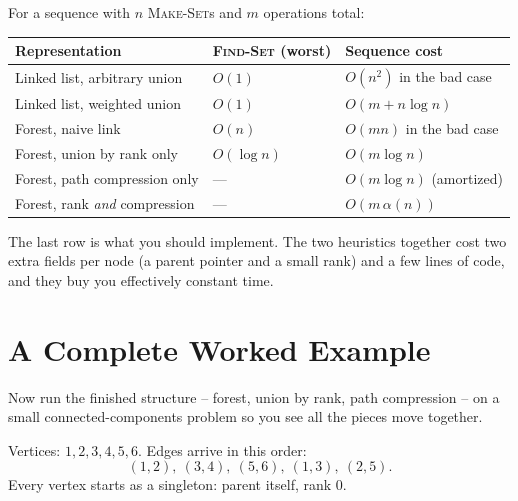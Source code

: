 \begin{complexitybox}
For a sequence with $n$ \textsc{Make-Set}s and $m$ operations total:
\begin{center}
\begin{tabular}{lll}
\toprule
Representation & \textsc{Find-Set} (worst) & Sequence cost \\
\midrule
Linked list, arbitrary union & $O(1)$ & $O(n^2)$ in the bad case \\
Linked list, weighted union & $O(1)$ & $O(m + n \log n)$ \\
Forest, naive link & $O(n)$ & $O(mn)$ in the bad case \\
Forest, union by rank only & $O(\log n)$ & $O(m \log n)$ \\
Forest, path compression only & --- & $O(m \log n)$ (amortized) \\
Forest, rank \emph{and} compression & --- & $\boxed{O(m\,\alpha(n))}$ \\
\bottomrule
\end{tabular}
\end{center}
The last row is what you should implement. The two heuristics together
cost two extra fields per node (a parent pointer and a small rank) and a few
lines of code, and they buy you effectively constant time.
\end{complexitybox}

\section{A Complete Worked Example}
\label{ch19:fullexample}

Now run the finished structure -- forest, union by rank, path compression --
on a small connected-components problem so you see all the pieces move together.

Vertices: $1, 2, 3, 4, 5, 6$. Edges arrive in this order:
\[
(1,2),\ (3,4),\ (5,6),\ (1,3),\ (2,5).
\]
Every vertex starts as a singleton: parent itself, rank $0$.

